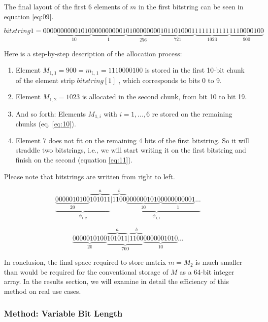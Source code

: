 \documentclass[10pt]{article}
\begin{document}
The final layout of the first 6 elements of $m$ in the first bitstring can be seen in equation \ref{eq:09}.

\begin{equation}\label{eq:09}
 bitstring 1 = 0000\underbrace{0000001010}_{10}\underbrace{0000000001}_{1}\underbrace{0100000000}_{256}\underbrace{1011010001}_{721}\underbrace{1111111111}_{1023}\underbrace{1110000100}_{900} 
\end{equation}

Here is a step-by-step description of the allocation process:
\begin{enumerate}
 \item Element $M_{1,1}=900 = m_{1,1} = 1110000100$ is stored in the first 10-bit chunk of the element strip $bitstring[1]$ , which corresponds to bits 0 to 9.
 \item Element $M_{1,2}=1023$ is allocated in the second chunk, from bit 10 to bit 19.
 \item And so forth: Elements $M_{1,i}$ with $i=1,\ldots,6$ re stored on the remaining chunks (eq. \ref{eq:10}).
 \item Element 7 does not fit on the remaining 4 bits of the first bitstring. So it will straddle two bitstrings, i.e., we will start writing it on the first bitstring and finish on the second (equation \ref{eq:11}).
\end{enumerate}

 Please note that bitstrings are written from right to left.

\begin{equation}\label{eq:10}
  \underbrace{\underbrace{0000010100}_{20}\overbrace{101011}^{a}}_{\phi_{1,2}}|\underbrace{\overbrace{1100}^{b}\underbrace{0000001010}_{10}\underbrace{0000000001}_{1}\hdots}_{\phi_{1,1}}
\end{equation}

\begin{equation}\label{eq:11}
  \underbrace{0000010100}_{20}\underbrace{\overbrace{101011}^a|\overbrace{1100}^{b}}_{700}\underbrace{0000001010}_{10}\ldots
\end{equation}

In conclusion, the final space required to store matrix $m = M_2$ is much smaller than would be required for the conventional storage of $M$ as a 64-bit integer array. In the results section, we will examine in detail the efficiency of this method on real use cases.

\subsubsection*{Method: Variable Bit Length}
\end{document}
